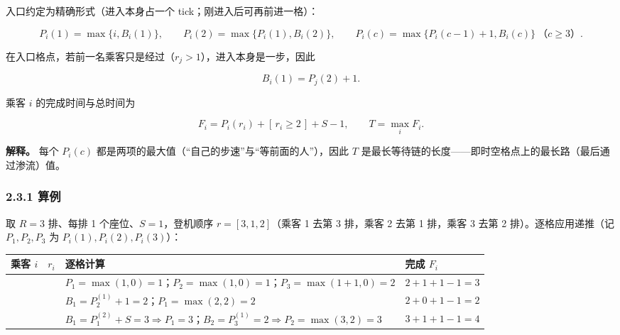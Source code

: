 \documentclass[
  11pt,
  UTF8,
  fontset=windows]{ctexart}
\newcounter{none} %
\begin{document}
入口约定为精确形式（进入本身占一个 tick；刚进入后可再前进一格）：

\[P_i(1)=\max\{i,B_i(1)\},\qquad P_i(2)=\max\{P_i(1),B_i(2)\},\qquad P_i(c)=\max\{P_i(c-1)+1,B_i(c)\}\ \text{（}c\ge 3\text{）}.\]

在入口格点，若前一名乘客只是经过（\(r_j>1\)），进入本身是一步，因此

\[B_i(1)=P_j(2)+1.\]

乘客 \(i\) 的完成时间与总时间为

\[F_i=P_i(r_i)+[\,r_i\ge 2\,]+S-1,\qquad T=\max_i F_i.\]

\textbf{解释。} 每个 \(P_i(c)\)
都是两项的最大值（``自己的步速''与``等前面的人''），因此 \(T\)
是最长等待链的长度------即时空格点上的最长路（最后通过渗流）值。

\subsubsection{2.3.1 算例}\label{ux7b97ux4f8b}

取 \(R=3\) 排、每排 1 个座位、\(S=1\)，登机顺序 \(r=[3,1,2]\)（乘客 1
去第 3 排，乘客 2 去第 1 排，乘客 3 去第 2 排）。逐格应用递推（记
\(P_1,P_2,P_3\) 为 \(P_i(1),P_i(2),P_i(3)\)）：

{\def\LTcaptype{none} %
\begin{longtable}[]{@{}
  >{\raggedright\arraybackslash}p{}
  >{\raggedright\arraybackslash}p{}
  >{\raggedright\arraybackslash}p{}
  >{\raggedright\arraybackslash}p{}@{}}
\toprule\noalign{}
\begin{minipage}[b]{\linewidth}\raggedright
乘客 \(i\)
\end{minipage} & \begin{minipage}[b]{\linewidth}\raggedright
\(r_i\)
\end{minipage} & \begin{minipage}[b]{\linewidth}\raggedright
逐格计算
\end{minipage} & \begin{minipage}[b]{\linewidth}\raggedright
完成 \(F_i\)
\end{minipage} \\
\midrule\noalign{}
\endhead
\bottomrule\noalign{}
\endlastfoot
1 & 3 & \(P_1=\max(1,0)=1\)；\(P_2=\max(1,0)=1\)；\(P_3=\max(1+1,0)=2\)
& \(2+1+1-1=3\) \\
2 & 1 & \(B_1=P^{(1)}_2+1=2\)；\(P_1=\max(2,2)=2\) & \(2+0+1-1=2\) \\
3 & 2 &
\(B_1=P^{(2)}_1+S=3\Rightarrow P_1=3\)；\(B_2=P^{(1)}_3=2\Rightarrow P_2=\max(3,2)=3\)
& \(3+1+1-1=4\) \\
\end{longtable}
}
\end{document}
